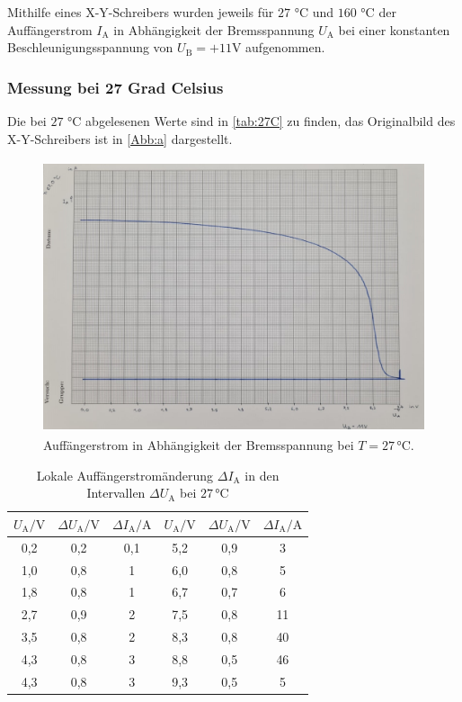Mithilfe eines X-Y-Schreibers wurden jeweils für $27 \, \, \si{\celsius}$ und $160 \, \, \si{\celsius}$
der Auffängerstrom $I_{\mathrm{A}}$ in Abhängigkeit der Bremsspannung $U_{\mathrm{A}}$ bei einer konstanten Beschleunigungsspannung
von $U_{\mathrm{B}} = + 11 \si{\volt}$ aufgenommen.\\

\subsubsection{Messung bei 27 Grad Celsius}

Die bei $27 \, \, \si{\celsius}$ abgelesenen Werte sind in \autoref{tab:27C} zu finden, das Originalbild
des X-Y-Schreibers ist in \autoref{Abb:a} dargestellt.

\begin{figure}
  \centering
  \includegraphics[height=8cm]{Messwerte/a.jpg}
  \caption{Auffängerstrom in Abhängigkeit der Bremsspannung bei $T=27\,\si{\celsius}$.}
  \label{Abb:a}
\end{figure}


\begin{table}[!h]
  \begin{center}
    \begin{tabular}{|c|c|c||c|c|c|}
      \hline
      $U_{\mathrm{A}} / \si{\volt}$ & $\Delta U_{\mathrm{A}} / \si{\volt}$ & $\Delta I_{\mathrm{A}} / \si{\ampere}$ & $U_{\mathrm{A}} / \si{\volt}$ & $\Delta U_{\mathrm{A}} / \si{\volt}$ & $\Delta I_{\mathrm{A}} / \si{\ampere}$\\
      \hline
      0,2 & 0,2 & 0,1 & 5,2 & 0,9 & 3  \\
      1,0 & 0,8 & 1   & 6,0 & 0,8 & 5  \\
      1,8 & 0,8 & 1   & 6,7 & 0,7 & 6 \\
      2,7 & 0,9 & 2   & 7,5 & 0,8 & 11 \\
      3,5 & 0,8 & 2   & 8,3 & 0,8 & 40 \\
      4,3 & 0,8 & 3   & 8,8 & 0,5 & 46 \\
      4,3 & 0,8 & 3   & 9,3 & 0,5 & 5 \\
      \hline
    \end{tabular}
    \caption{Lokale Auffängerstromänderung $\Delta I_{\mathrm{A}}$ in den Intervallen $\Delta U_{\mathrm{A}}$  bei $27 \, \si{\celsius}$}
    \label{tab:27C}
  \end{center}
\end{table}

